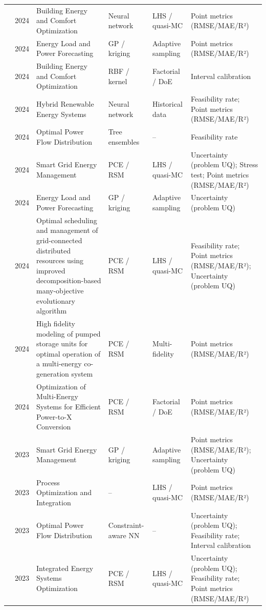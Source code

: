 \begin{longtable}{@{}p{} p{} p{} p{} p{} p{}@{}}
  \cite{Ren2024} & 2024 & Building Energy and Comfort Optimization & Neural network & LHS / quasi-MC & Point metrics (RMSE/MAE/R²) \\
  \cite{Shi2024__2} & 2024 & Energy Load and Power Forecasting & GP / kriging & Adaptive sampling & Point metrics (RMSE/MAE/R²) \\
  \cite{Sánchez-Zabala2024} & 2024 & Building Energy and Comfort Optimization & RBF / kernel & Factorial / DoE & Interval calibration \\
  \cite{Wang2024} & 2024 & Hybrid Renewable Energy Systems & Neural network & Historical data & Feasibility rate; Point metrics (RMSE/MAE/R²) \\
  \cite{Wu2024391} & 2024 & Optimal Power Flow Distribution & Tree ensembles & -- & Feasibility rate \\
  \cite{Yang2024__2} & 2024 & Smart Grid Energy Management & PCE / RSM & LHS / quasi-MC & Uncertainty (problem UQ); Stress test; Point metrics (RMSE/MAE/R²) \\
  \cite{Zhang2024821} & 2024 & Energy Load and Power Forecasting & GP / kriging & Adaptive sampling & Uncertainty (problem UQ) \\
  \cite{abbas_optimal_2024} & 2024 & Optimal scheduling and management of grid-connected distributed resources using improved decomposition-based many-objective evolutionary algorithm & PCE / RSM & LHS / quasi-MC & Feasibility rate; Point metrics (RMSE/MAE/R²); Uncertainty (problem UQ) \\
  \cite{liang_high_2024} & 2024 & High fidelity modeling of pumped storage units for optimal operation of a multi-energy co-generation system & PCE / RSM & Multi-fidelity & Point metrics (RMSE/MAE/R²) \\
  \cite{malla_sg_optimization_2024} & 2024 & Optimization of Multi-Energy Systems for Efficient Power-to-X Conversion & PCE / RSM & Factorial / DoE & Point metrics (RMSE/MAE/R²) \\
  \cite{Angizeh2023134995} & 2023 & Smart Grid Energy Management & GP / kriging & Adaptive sampling & Point metrics (RMSE/MAE/R²); Uncertainty (problem UQ) \\
  \cite{Cao2023__2} & 2023 & Process Optimization and Integration & -- & LHS / quasi-MC & Point metrics (RMSE/MAE/R²) \\
  \cite{Chen2023657} & 2023 & Optimal Power Flow Distribution & Constraint-aware NN & -- & Uncertainty (problem UQ); Feasibility rate; Interval calibration \\
  \cite{Dong2023} & 2023 & Integrated Energy Systems Optimization & PCE / RSM & LHS / quasi-MC & Uncertainty (problem UQ); Feasibility rate; Point metrics (RMSE/MAE/R²) \\

\end{longtable}
